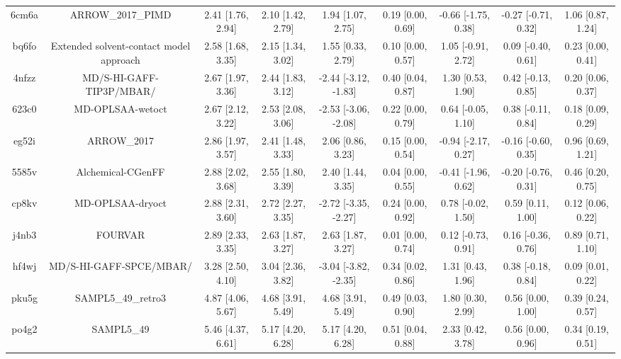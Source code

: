 \documentclass{article}
\begin{document}
\begin{center}
\begin{longtable}{|ccccccccc|}
 6cm6a &                                  ARROW\_2017\_PIMD &  2.41 [1.76, 2.94] &  2.10 [1.42, 2.79] &     1.94 [1.07, 2.75] &  0.19 [0.00, 0.69] &  -0.66 [-1.75, 0.38] &  -0.27 [-0.71, 0.32] &     1.06 [0.87, 1.24] \\
 bq6fo &            Extended solvent-contact model approach &  2.58 [1.68, 3.35] &  2.15 [1.34, 3.02] &     1.55 [0.33, 2.79] &  0.10 [0.00, 0.57] &   1.05 [-0.91, 2.72] &   0.09 [-0.40, 0.61] &     0.23 [0.00, 0.41] \\
 4nfzz &                           MD/S-HI-GAFF-TIP3P/MBAR/ &  2.67 [1.97, 3.36] &  2.44 [1.83, 3.12] &  -2.44 [-3.12, -1.83] &  0.40 [0.04, 0.87] &    1.30 [0.53, 1.90] &   0.42 [-0.13, 0.85] &     0.20 [0.06, 0.37] \\
 623c0 &                                   MD-OPLSAA-wetoct &  2.67 [2.12, 3.22] &  2.53 [2.08, 3.06] &  -2.53 [-3.06, -2.08] &  0.22 [0.00, 0.79] &   0.64 [-0.05, 1.10] &   0.38 [-0.11, 0.84] &     0.18 [0.09, 0.29] \\
 eg52i &                                        ARROW\_2017 &  2.86 [1.97, 3.57] &  2.41 [1.48, 3.33] &     2.06 [0.86, 3.23] &  0.15 [0.00, 0.54] &  -0.94 [-2.17, 0.27] &  -0.16 [-0.60, 0.35] &     0.96 [0.69, 1.21] \\
 5585v &                                  Alchemical-CGenFF &  2.88 [2.02, 3.68] &  2.55 [1.80, 3.39] &     2.40 [1.44, 3.35] &  0.04 [0.00, 0.55] &  -0.41 [-1.96, 0.62] &  -0.20 [-0.76, 0.31] &     0.46 [0.20, 0.75] \\
 cp8kv &                                   MD-OPLSAA-dryoct &  2.88 [2.31, 3.60] &  2.72 [2.27, 3.35] &  -2.72 [-3.35, -2.27] &  0.24 [0.00, 0.92] &   0.78 [-0.02, 1.50] &    0.59 [0.11, 1.00] &     0.12 [0.06, 0.22] \\
 j4nb3 &                                            FOURVAR &  2.89 [2.33, 3.35] &  2.63 [1.87, 3.27] &     2.63 [1.87, 3.27] &  0.01 [0.00, 0.74] &   0.12 [-0.73, 0.91] &   0.16 [-0.36, 0.76] &     0.89 [0.71, 1.10] \\
 hf4wj &                            MD/S-HI-GAFF-SPCE/MBAR/ &  3.28 [2.50, 4.10] &  3.04 [2.36, 3.82] &  -3.04 [-3.82, -2.35] &  0.34 [0.02, 0.86] &    1.31 [0.43, 1.96] &   0.38 [-0.18, 0.84] &     0.09 [0.01, 0.22] \\
 pku5g &                                 SAMPL5\_49\_retro3 &  4.87 [4.06, 5.67] &  4.68 [3.91, 5.49] &     4.68 [3.91, 5.49] &  0.49 [0.03, 0.90] &    1.80 [0.30, 2.99] &    0.56 [0.00, 1.00] &     0.39 [0.24, 0.57] \\
 po4g2 &                                         SAMPL5\_49 &  5.46 [4.37, 6.61] &  5.17 [4.20, 6.28] &     5.17 [4.20, 6.28] &  0.51 [0.04, 0.88] &    2.33 [0.42, 3.78] &    0.56 [0.00, 0.96] &     0.34 [0.19, 0.51] \\
\end{longtable}
\end{center}
\end{document}
